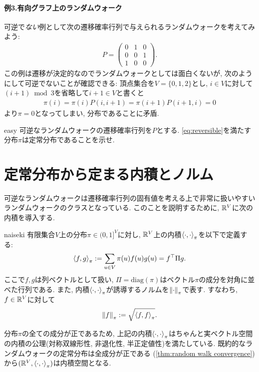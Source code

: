 \paragraph*{例3.有向グラフ上のランダムウォーク}
可逆で\emph{ない}例として次の遷移確率行列で与えられるランダムウォークを考えてみよう:
\begin{align*}
    P = \begin{pmatrix}
            0 & 1 & 0 \\
            0 & 0 & 1 \\
            1 & 0 & 0
        \end{pmatrix}.
\end{align*}
この例は遷移が決定的なのでランダムウォークとしては面白くないが,
次のようにして可逆でないことが確認できる:
頂点集合を$V=\{0,1,2\}$とし, $i\in V$に対して$(i+1)\bmod 3$を省略して$i+1 \in V$と書くと
\begin{align*}
    \pi(i) = \pi(i) P(i, i+1) = \pi(i+1)P(i+1,i) = 0
\end{align*}
より$\pi=0$となってしまい, 分布であることに矛盾.

\begin{exercise}{easy}{}
    可逆なランダムウォークの遷移確率行列を$P$とする.
    \cref{eq:reversible}を満たす分布$\pi$は定常分布であることを示せ.
\end{exercise}

%


\section{定常分布から定まる内積とノルム}
可逆なランダムウォークは遷移確率行列の固有値を考える上で非常に扱いやすいランダムウォークのクラスとなっている.
このことを説明するために, $\mathbb{R}^V$に次の内積を導入する.
\begin{definition}{}{naiseki}
    有限集合$V$上の分布$\pi\in(0,1]^V$に対し,
    $\mathbb{R}^V$上の内積$\left\langle\cdot,\cdot\right\rangle_{\pi}$を以下で定義する:
    \begin{align*}
        \left\langle f,g\right\rangle_{\pi} \mathrel{:=} \sum_{u \in V} \pi(u) f(u) g(u)
        = f^\top \Pi g.
    \end{align*}
    ここで$f,g$は列ベクトルとして扱い, $\Pi=\mathrm{diag}(\pi)$はベクトル$\pi$の成分を対角に並べた行列である.
    また, 内積$\left\langle\cdot,\cdot\right\rangle_{\pi}$が誘導するノルムを$\left\lVert\cdot\right\rVert_{\pi}$で表す.
    すなわち, $f\in\mathbb{R}^V$に対して
    \[
        \left\lVert f\right\rVert_{\pi} \mathrel{:=} \sqrt{\left\langle f,f\right\rangle_{\pi}}.
    \]
\end{definition}
分布$\pi$の全ての成分が正であるため,
上記の内積$\left\langle\cdot,\cdot\right\rangle_{\pi}$はちゃんと実ベクトル空間の内積の公理(対称双線形性, 非退化性, 半正定値性)を満たしている.
既約的なランダムウォークの定常分布は全成分が正である
(\cref{thm:random walk convergence})
から$(\mathbb{R}^V,\left\langle\cdot,\cdot\right\rangle_{\pi})$は内積空間となる.

